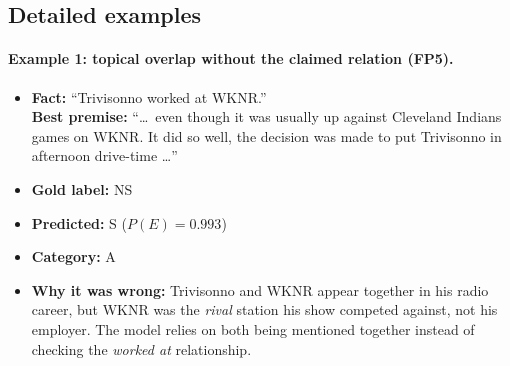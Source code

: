 \documentclass[12pt,a4paper]{article}
\begin{document}
\subsection{Detailed examples}
\label{sec:examples}

\paragraph{Example 1: topical overlap without the claimed relation (FP5).}
\begin{itemize}[leftmargin=1.2em]
\item[(a)] \textbf{Fact:} ``Trivisonno worked at WKNR.''\\
\textbf{Best premise:} ``\dots\ even though it was usually up against Cleveland Indians games on WKNR. It did so well, the decision was made to put Trivisonno in afternoon drive-time \dots''
\item[(b)] \textbf{Gold label:} NS
\item[(c)] \textbf{Predicted:} S ($P(E) = 0.993$)
\item[(d)] \textbf{Category:} A
\item[(e)] \textbf{Why it was wrong:} Trivisonno and WKNR appear together in his radio career, but WKNR was the \emph{rival} station his show competed against, not his employer. The model relies on both being mentioned together instead of checking the \emph{worked at} relationship.
\end{itemize}

\end{document}
